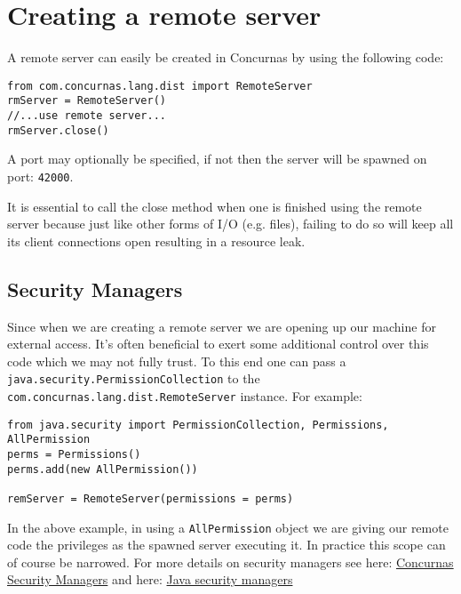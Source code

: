 \documentclass[conc-doc]{subfiles}
\begin{document}
\section{Creating a remote server}	
A remote server can easily be created in Concurnas by using the following code:
\begin{lstlisting}
from com.concurnas.lang.dist import RemoteServer
rmServer = RemoteServer()
//...use remote server...
rmServer.close()
\end{lstlisting}

A port may optionally be specified, if not then the server will be spawned on port: \lstinline{42000}.

It is essential to call the close method when one is finished using the remote server because just like other forms of I/O (e.g. files), failing to do so will keep all its client connections open resulting in a resource leak.

\subsection{Security Managers}
\begin{sloppypar}
Since when we are creating a remote server we are opening up our machine for external access. It's often beneficial to exert some additional control over this code which we may not fully trust. To this end one can pass a \lstinline{java.security.PermissionCollection} to the \lstinline{com.concurnas.lang.dist.RemoteServer} instance. For example:
\end{sloppypar}

\begin{lstlisting}
from java.security import PermissionCollection, Permissions, AllPermission
perms = Permissions()
perms.add(new AllPermission())

remServer = RemoteServer(permissions = perms)
\end{lstlisting}

\begin{sloppypar}
In the above example, in using a \lstinline{AllPermission} object we are giving our remote code the privileges as the spawned server executing it. In practice this scope can of course be narrowed. For more details on security managers see here: \hyperref[sec:Security Managers]{Concurnas Security Managers} and here: \href{https://docs.oracle.com/javase/8/docs/technotes/guides/security/spec/security-spec.doc3.html}{Java security managers}
\end{sloppypar}
\end{document}
